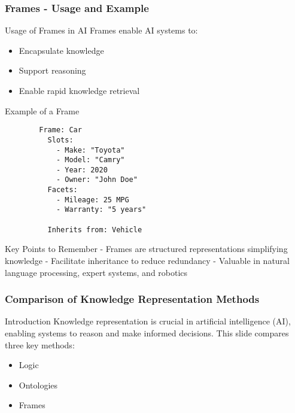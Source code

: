 \documentclass[aspectratio=169]{beamer}
\begin{document}
\begin{frame}[fragile]
    \frametitle{Frames - Usage and Example}
    \begin{block}{Usage of Frames in AI}
        Frames enable AI systems to:
        \begin{itemize}
            \item Encapsulate knowledge
            \item Support reasoning
            \item Enable rapid knowledge retrieval
        \end{itemize}
    \end{block}

    \begin{block}{Example of a Frame}
        \begin{verbatim}
        Frame: Car
          Slots:
            - Make: "Toyota"
            - Model: "Camry"
            - Year: 2020
            - Owner: "John Doe"
          Facets:
            - Mileage: 25 MPG
            - Warranty: "5 years"
            
          Inherits from: Vehicle
        \end{verbatim}
    \end{block}
    
    \begin{block}{Key Points to Remember}
        - Frames are structured representations simplifying knowledge
        - Facilitate inheritance to reduce redundancy
        - Valuable in natural language processing, expert systems, and robotics
    \end{block}
\end{frame}

\begin{frame}[fragile]
    \frametitle{Comparison of Knowledge Representation Methods}
    \begin{block}{Introduction}
        Knowledge representation is crucial in artificial intelligence (AI), enabling systems to reason and make informed decisions. This slide compares three key methods:
        \begin{itemize}
            \item Logic
            \item Ontologies
            \item Frames
        \end{itemize}
    \end{block}
\end{frame}
\end{document}

